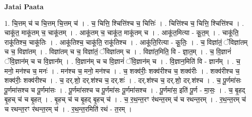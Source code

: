 \documentclass[17pt]{extarticle}
\begin{document}
\textbf{Jatai Paata} \newline

1. चि॒त्तम् च॑ च चि॒त्तम् चि॒त्तम् च॑ । . च॒ चित्ति॒ श्चित्ति॑श्च च॒ चित्तिः॑ । . चित्ति॑श्च च॒ चित्ति॒ श्चित्ति॑श्च । . चाकू॑त॒ माकू॑तम् च॒ चाकू॑तम् । . आकू॑तम् च॒ चाकू॑त॒ माकू॑तम् च । . आकू॑त॒मित्या - कू॒त॒म् । . चाकू॑ति॒ राकू॑तिश्च॒ चाकू॑तिः । . आकू॑तिश्च॒ चाकू॑ति॒ राकू॑तिश्च । . आकू॑ति॒रित्या - कू॒तिः॒ । . च॒ विज्ञा॑तं॒ ॅविज्ञा॑तम् च च॒ विज्ञा॑तम् । . विज्ञा॑तम् च च॒ विज्ञा॑तं॒ ॅविज्ञा॑तम् च । . विज्ञा॑त॒मिति॒ वि - ज्ञा॒त॒म् । . च॒ वि॒ज्ञानं॑ ॅवि॒ज्ञान॑म् च च वि॒ज्ञान᳚म् । . वि॒ज्ञान॑म् च च वि॒ज्ञानं॑ ॅवि॒ज्ञान॑म् च । . वि॒ज्ञान॒मिति॑ वि - ज्ञान᳚म् । . च॒ मनो॒ मन॑श्च च॒ मनः॑ । . मन॑श्च च॒ मनो॒ मन॑श्च । . च॒ शक्व॑रीः॒ शक्व॑रीश्च च॒ शक्व॑रीः । . शक्व॑रीश्च च॒ शक्व॑रीः॒ शक्व॑रीश्च । . च॒ दर्.शो॒ दर्.श॑श्च च॒ दर्.शः॑ । . दर्.श॑श्च च॒ दर्.शो॒ दर्.श॑श्च । . च॒ पू॒र्णमा॑सः पू॒र्णमा॑सश्च च पू॒र्णमा॑सः । . पू॒र्णमा॑सश्च च पू॒र्णमा॑सः पू॒र्णमा॑सश्च । . पू॒र्णमा॑स॒ इति॑ पू॒र्ण - मा॒सः॒ । . च॒ बृ॒हद् बृ॒हच् च॑ च बृ॒हत् । . बृ॒हच् च॑ च बृ॒हद् बृ॒हच् च॑ । . च॒ र॒थ॒न्त॒रꣳ र॑थन्त॒रम् च॑ च रथन्त॒रम् । . र॒थ॒न्त॒रम् च॑ च रथन्त॒रꣳ र॑थन्त॒रम् च॑ । . र॒थ॒न्त॒रमिति॑ रथं - त॒रम् । \newline
\end{document}
